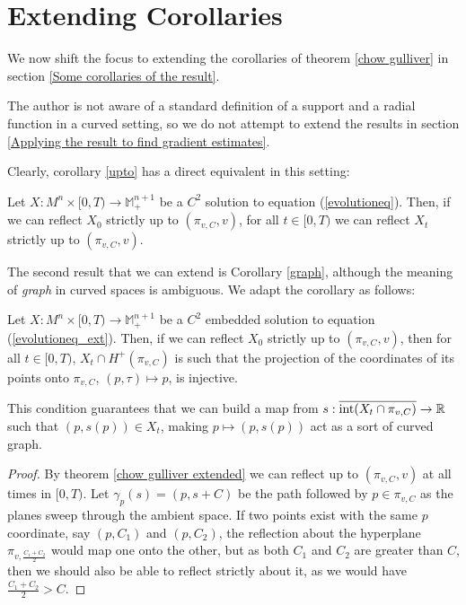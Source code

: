 \section{Extending Corollaries}

We now shift the focus to extending the corollaries of theorem \ref{chow gulliver} in section \ref{Some corollaries of the result}. 

The author is not aware of a standard definition of a support and a radial function in a curved setting, so we do not attempt to extend the results in section \ref{Applying the result to find gradient estimates}. 

Clearly, corollary \ref{upto} has a direct equivalent in this setting:
\begin{cor}
	Let $X:M^n\times [0,T) \rightarrow \mathbb{M}^{n+1}_+$ be a $C^2$ solution to equation (\ref{evolutioneq}). Then, if we can reflect $X_0$ strictly up to $(\pi_{v,C},v)$, for all $t\in [0,T)$ we can reflect $X_t$ strictly up to $(\pi_{v,C},v)$.  
\end{cor}

The second result that we can extend is Corollary \ref{graph}, although the meaning of \textit{graph} in curved spaces is ambiguous. We adapt the corollary as follows: 


\begin{cor}
	Let $X:M^n\times [0,T) \rightarrow \mathbb{M}^{n+1}_+$ be a $C^2$ embedded solution to equation (\ref{evolutioneq_ext}). Then, if we can reflect $X_0$ strictly up to $(\pi_{v,C},v)$, then for all $t\in [0,T)$, $X_t \cap H^+(\pi_{v,C})$ is such that the projection of the coordinates of its points onto $\pi_{v,C}$, $(p, \tau)\mapsto p$, is injective. 
\end{cor}
This condition guarantees that we can build a map from $s:\overline{\mathrm{int}(X_t \cap \pi_{v,C})}\rightarrow \mathbb{R}$ such that $(p, s(p))\in X_t$, making $p\mapsto (p, s(p))$ act as a sort of curved graph. 
\begin{proof}
	By  theorem \ref{chow gulliver extended} we can reflect up to $(\pi_{v,C},v)$ at all times in $[0,T)$. Let $\gamma_p(s)=(p, s+C)$ be the path followed by $p\in \pi_{v,C}$ as the planes sweep through the ambient space. If two points exist with the same $p$ coordinate, say $(p, C_1)$ and $(p, C_2)$, the reflection about the hyperplane $\pi_{v,\frac{ C_1 +  C_2}{2}}$ would map one onto the other, but as both $C_1$ and $C_2$ are greater than $C$, then we should also be able to reflect strictly about it, as we would have $\frac{ C_1 +  C_2}{2}>C$. 
\end{proof}

